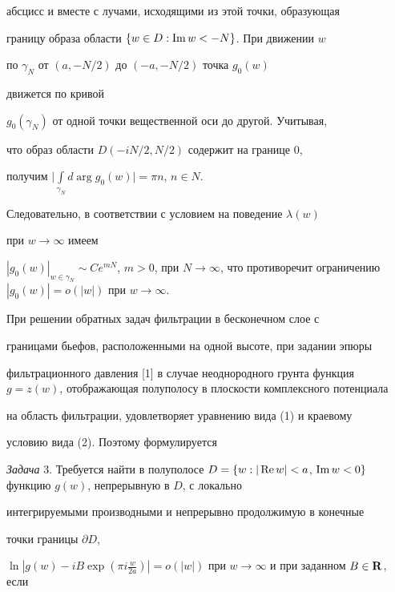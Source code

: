 \begin{pf}
абсцисс и вместе с лучами, исходящими из этой точки, образующая


границу образа области $\{w \in D: \operatorname{Im} w < - N\}$. При движении $w$


по $\gamma_N$ от $(a, - N/2)$ до $(- a, - N/2)$ точка $g_0(w)$


движется по кривой


$g_0(\gamma_N)$ от одной точки вещественной оси до другой. Учитывая,


что образ области $D(-i N/2, N/2)$ содержит на границе $0$,


получим $\Big|\int\limits_{\gamma_N} d\arg g_0(w)\Big| = \pi n$, $n \in N$.


Следовательно, в соответствии с условием на поведение $\lambda(w)$


при $w \to \infty$ имеем


$|g_0(w)|_{w \in \gamma_N} \sim C e^{mN}$, $m > 0$, при $N \to


\infty$, что противоречит ограничению $|g_0(w)| = o(|w|)$ при $w \to


\infty$.


\end{pf}





При решении обратных задач фильтрации в бесконечном слое с


границами бьефов, расположенными на одной высоте, при задании эпюры


фильтрационного давления [1] в случае неоднородного грунта функция $g


= z(w)$, отображающая полуполосу в плоскости комплексного потенциала


на область фильтрации, удовлетворяет уравнению вида (1) и краевому


условию вида (2). Поэтому формулируется


\medskip





{\it Задача} 3. Требуется найти в полуполосе $D = \{w: |\re w|<a$, $\im w


<0\}$ функцию $g(w)$, непрерывную в $D$, с локально


интегрируемыми производными и непрерывно продолжимую в конечные


точки границы $\partial D$,


$\ln |g(w) - i B \exp (\pi i \frac{w}{2a})|


= o(|w|)$ при $w \to \infty$ и при заданном $B \in {\bold R}$, если



